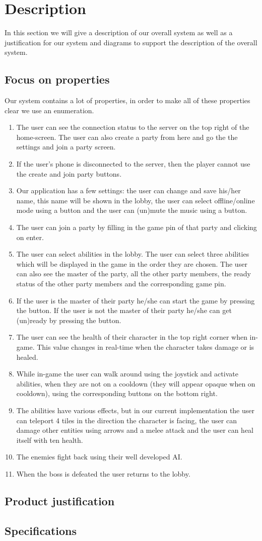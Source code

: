 \documentclass[../main.tex]{subfiles}
\begin{document}
\pagebreak
\section{Description}
In this section we will give a description of our overall system as well as a justification for our system and diagrams to support the description of the overall system.

    \subsection{Focus on properties}
	Our system contains a lot of properties, in order to make all of these properties clear we use an enumeration.
	\begin{enumerate}
		\item The user can see the connection status to the server on the top right of the home-screen. The user can also create a party from here and go the the settings and join a party screen.
		\item If the user's phone is disconnected to the server, then the player cannot use the create and join party buttons.
		\item Our application has a few settings: the user can change and save his/her name, this name will be shown in the lobby, the user can select offline/online mode using a button and the user can (un)mute the music using a button.
		\item The user can join a party by filling in the game pin of that party and clicking on enter.
		\item The user can select abilities in the lobby. The user can select three abilities which will be displayed in the game in the order they are chosen. The user can also see the master of the party, all the other party members, the ready status of the other party members and the corresponding game pin.
		\item If the user is the master of their party he/she can start the game by pressing the button. If the user is not the master of their party he/she can get (un)ready by pressing the button.
		\item The user can see the health of their character in the top right corner when in-game. This value changes in real-time when the character takes damage or is healed.
		\item While in-game the user can walk around using the joystick and activate abilities, when they are not on a cooldown (they will appear opaque when on cooldown), using the corresponding buttons on the bottom right. 
		\item The abilities have various effects, but in our current implementation the user can teleport 4 tiles in the direction the character is facing, the user can damage other entities using arrows and a melee attack and the user can heal itself with ten health.
		\item The enemies fight back using their well developed AI.
		\item When the boss is defeated the user returns to the lobby.
    \end{enumerate}

	\subsection{Product justification}

    \subsection{Specifications}
\end{document}
